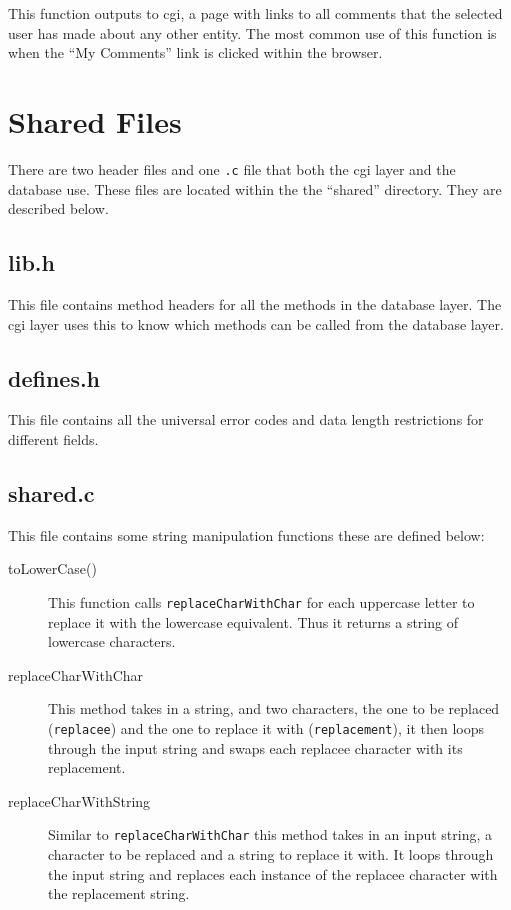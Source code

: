 \documentclass{article}
\begin{document}
This function outputs to cgi, a page with links to all comments that the selected user has made about any other entity. The most common use of this function is when the ``My Comments'' link is clicked within the browser.

\section{Shared Files}
There are two header files and one \verb|.c| file that both the cgi layer and the database use. These files are located within the the ``shared'' directory. They are described below.
\subsection{lib.h}
This file contains method headers for all the methods in the database layer. The cgi layer uses this to know which methods can be called from the database layer.
\subsection{defines.h}
This file contains all the universal error codes and data length restrictions for different fields. 
\subsection{shared.c}
This file contains some string manipulation functions these are defined below:
\begin{description}
\item[toLowerCase()] This function calls \verb|replaceCharWithChar| for each uppercase letter to replace it with the lowercase equivalent. Thus it returns a string of lowercase characters.
\item[replaceCharWithChar] This method takes in a string, and two characters, the one to be replaced (\verb|replacee|) and the one to replace it with (\verb|replacement|), it then loops through the input string and swaps each replacee character with its replacement.
\item[replaceCharWithString] Similar to \verb|replaceCharWithChar| this method takes in an input string, a character to be replaced and a string to replace it with. It loops through the input string and replaces each instance of the replacee character with the replacement string.


\end{description}
\end{document}
